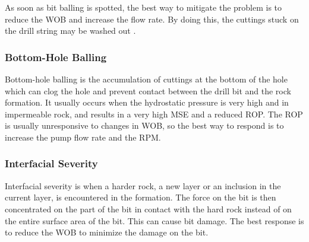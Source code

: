 As soon as bit balling is spotted, the best way to mitigate the problem is to reduce the WOB and increase the flow rate. By doing this, the cuttings stuck on the drill string may be washed out \cite{bitballing}.

\subsubsection{Bottom-Hole Balling}
Bottom-hole balling is the accumulation of cuttings at the bottom of the hole which can clog the hole and prevent contact between the drill bit and the rock formation. It usually occurs when the hydrostatic pressure is very high and in impermeable rock, and results in a very high MSE and a reduced ROP. The ROP is usually unresponsive to changes in WOB, so the best way to respond is to increase the pump flow rate and the RPM.

\subsubsection{Interfacial Severity}
Interfacial severity is when a harder rock, a new layer or an inclusion in the current layer, is encountered in the formation. The force on the bit is then concentrated on the part of the bit in contact with the hard rock instead of on the entire surface area of the bit. This can cause bit damage. The best response is to reduce the WOB to minimize the damage on the bit.

